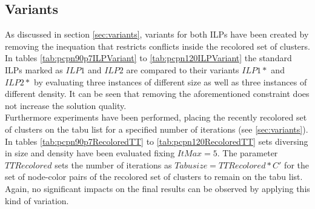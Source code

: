 \subsection{Variants}
As discussed in section \ref{sec:variants}, variants for both ILPs have been created by removing the inequation that restricts conflicts inside the recolored set of clusters. In tables \ref{tab:pcpn90p7ILPVariant} to \ref{tab:pcpn120ILPVariant} the standard ILPs marked as $ILP1$ and $ILP2$ are compared to their variants $ILP1*$ and $ILP2*$ by evaluating three instances of different size as well as three instances of different density. It can be seen that removing the aforementioned constraint does not increase the solution quality.\\
Furthermore experiments have been performed, placing the recently recolored set of clusters on the tabu list for a specified number of iterations (see \ref{sec:variants}). In tables \ref{tab:pcpn90p7RecoloredTT} to \ref{tab:pcpn120RecoloredTT} sets diversing in size and density have been evaluated fixing $ItMax=5$. The parameter $TTRecolored$ sets the number of iterations as $Tabusize=TTRecolored*C'$ for the set of node-color pairs of the recolored set of clusters to remain on the tabu list. Again, no significant impacts on the final results can be observed by applying this kind of variation.

